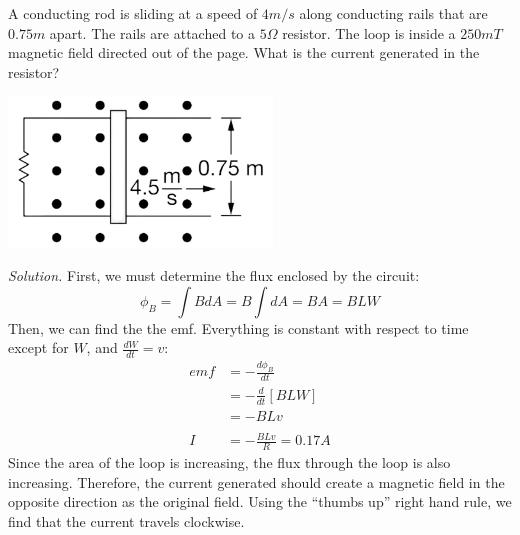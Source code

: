 \documentclass[12pt, titlepage]{article}
\begin{document}
\begin{Problem}
    A conducting rod is sliding at a speed of $4 m/s$ along conducting rails that are $0.75m$ apart. The rails are attached to a $5\Omega$ resistor. The loop is inside a $250 mT$ magnetic field directed out of the page. What is the current generated in the resistor?
    \begin{center}
        \includegraphics*[height=4cm]{media/lenz.png}
    \end{center}
    \tcblower
    \textit{Solution.} First, we must determine the flux enclosed by the circuit: 
    \begin{equation*}
        \phi_B = \int BdA = B\int dA = BA = BLW
    \end{equation*}
    Then, we can find the the emf. Everything is constant with respect to time except for $W$, and $\frac{dW}{dt} = v$:
    \begin{align*}
        emf &= -\frac{d\phi_B}{dt} \\
        &= -\frac{d}{dt}\left[BLW\right] \\
        &= -BLv \\ \\
        I &= -\frac{BLv}{R} = 0.17A
    \end{align*}
    Since the area of the loop is increasing, the flux through the loop is also increasing. Therefore, the current generated should create a magnetic field in the opposite direction as the original field. Using the ``thumbs up'' right hand rule, we find that the current travels clockwise.
\end{Problem}
\end{document}
